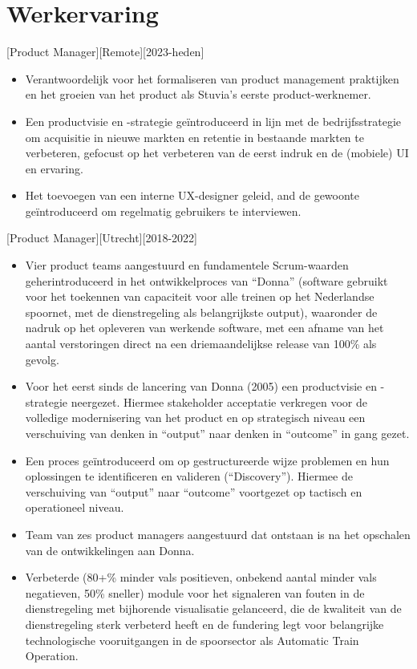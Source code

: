 \documentclass[10pt]{article}
\begin{document}
\makecvtitle

\section{Werkervaring}
\label{sec:work}

[Product Manager][Remote][2023-heden]
\begin{itemize}
    \item Verantwoordelijk voor het formaliseren van product management praktijken en het groeien van het product als Stuvia's eerste product-werknemer.
    \item Een productvisie en -strategie geïntroduceerd in lijn met de bedrijfsstrategie om acquisitie in nieuwe markten en retentie in bestaande markten te verbeteren, gefocust op het verbeteren van de eerst indruk en de (mobiele) UI en ervaring.
    \item Het toevoegen van een interne UX-designer geleid, and de gewoonte geïntroduceerd om regelmatig gebruikers te interviewen.
\end{itemize}

[Product Manager][Utrecht][2018-2022]
\begin{itemize}
    \item Vier product teams aangestuurd en fundamentele Scrum-waarden geherintroduceerd in het ontwikkelproces van \enquote{Donna} (software gebruikt voor het toekennen van capaciteit voor alle treinen op het Nederlandse spoornet, met de dienstregeling als belangrijkste output), waaronder de nadruk op het opleveren van werkende software, met een afname van het aantal verstoringen direct na een driemaandelijkse release van 100\% als gevolg.
    \item Voor het eerst sinds de lancering van Donna (2005) een productvisie en -strategie neergezet. Hiermee stakeholder acceptatie verkregen voor de volledige modernisering van het product en op strategisch niveau een verschuiving van denken in “output” naar denken in “outcome” in gang gezet.
    \item Een proces geïntroduceerd om op gestructureerde wijze problemen en hun oplossingen te identificeren en valideren (\enquote{Discovery}). Hiermee de verschuiving van “output” naar “outcome” voortgezet op tactisch en operationeel niveau.
    \item Team van zes product managers aangestuurd dat ontstaan is na het opschalen van de ontwikkelingen aan Donna.
    \item Verbeterde (80+\% minder vals positieven, onbekend aantal minder vals negatieven, 50\% sneller) module voor het signaleren van fouten in de dienstregeling met bijhorende visualisatie gelanceerd, die de kwaliteit van de dienstregeling sterk verbeterd heeft en de fundering legt voor belangrijke technologische vooruitgangen in de spoorsector als Automatic Train Operation.
\end{itemize}
\end{document}
